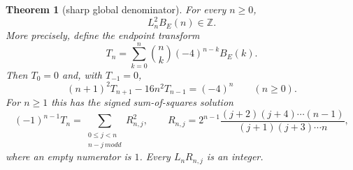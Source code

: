 \documentclass[11pt]{article}
\newtheorem{theorem}{Theorem}[section]
\theoremstyle{definition}
\theoremstyle{remark}
\newcommand{\Z}{\mathbb Z}
\begin{document}
\begin{theorem}[sharp global denominator]\label{thm:sharpden}
For every $n\ge0$,
\begin{equation}\label{eq:sharpden}
 L_n^2B_E(n)\in\Z.
\end{equation}
More precisely, define the endpoint transform
\begin{equation}\label{eq:Ttransform}
 T_n=\sum_{k=0}^n\binom nk(-4)^{n-k}B_E(k).
\end{equation}
Then $T_0=0$ and, with $T_{-1}=0$,
\begin{equation}\label{eq:Trec}
 (n+1)^2T_{n+1}-16n^2T_{n-1}=(-4)^n\qquad(n\ge0).
\end{equation}
For $n\ge1$ this has the signed sum-of-squares solution
\begin{equation}\label{eq:Tsquares}
 (-1)^{n-1}T_n=
 \sum_{\substack{0\le j<n\\n-j\ {
m odd}}}R_{n,j}^2,
 \qquad
 R_{n,j}=2^{n-1}
 \frac{(j+2)(j+4)\cdots(n-1)}{(j+1)(j+3)\cdots n},
\end{equation}
where an empty numerator is $1$.  Every $L_nR_{n,j}$ is an integer.
\end{theorem}
\end{document}
